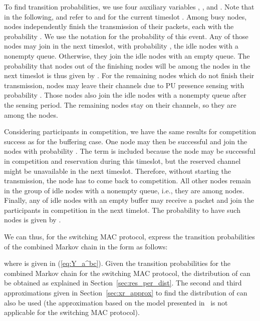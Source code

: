\documentclass[12pt,journal,oneside,onecolumn]{IEEEtran}
\newcounter{mytempeqncnt}
\begin{document}
To find transition probabilities, we use four 
auxiliary variables , ,  and . Note that in 
the following,   and  refer to  and  
for the current timeslot . 
Among  busy nodes,  nodes independently finish the transmission 
of their packets, each with the probability . 
We use the notation  
for the probability of this event. Any of those  nodes may  join in the next timeslot, with probability , the idle nodes with a nonempty 
queue. Otherwise, they join 
the idle nodes with an empty queue. 
The probability that  nodes out of the  finishing nodes will be among the  nodes in the next
timeslot is thus given by  .
For the remaining  nodes which do not finish their transmission,  nodes 
may leave their channels due to PU presence sensing with  
probability .
Those nodes also join the  idle nodes with a nonempty queue after the sensing period.
The remaining  nodes stay on their channels, 
so they are among the  nodes.

Considering  participants in competition, we have the 
same results for competition success as for the buffering case. One node may then be 
successful and join the  nodes with probability . The 
 term is included because the node may be successful in 
competition and reservation during this timeslot, but 
the reserved channel might be unavailable in the next timeslot. 
Therefore, without starting the transmission, the node 
has to come back to competition.  All other  nodes 
remain in the group of idle nodes with a nonempty queue, 
i.e., they are among  nodes. Finally, any of 
 idle nodes with an empty buffer may receive a 
packet and join the participants in competition in the 
next timelot. The probability to have  such nodes is 
given by . 

We can thus, for the switching MAC protocol, express the transition probabilities 
of the combined Markov chain in the form  as follows:

\begin{figure*}[!t]
\setcounter{mytempeqncnt}{\value{equation}}
\setcounter{equation}{14}
\footnotesize

\normalsize
\setcounter{equation}{\value{mytempeqncnt}}
\hrulefill
\vspace*{4pt}
\end{figure*}
where  is given in (\ref{eq:Y_a^bc}).
Given the transition probabilities for the combined Markov chain for the switching MAC protocol, the distribution of  can
be obtained as explained in Section~\ref{sec:res_per_dist}. The second and third approximations given
in Section~\ref{sec:xr_approx} to find the distribution of  can also be used (the approximation based on the
model presented in~\cite{pawelczak09} is not applicable for the switching MAC protocol).
\end{document}
